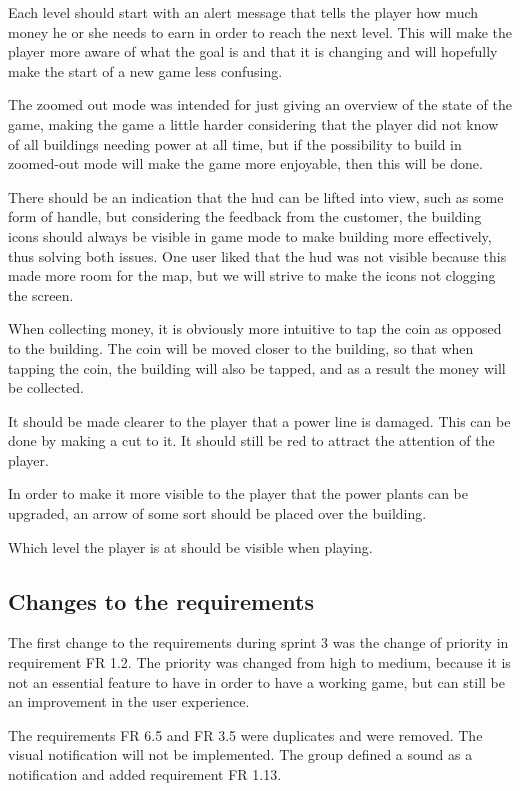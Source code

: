 	Each level should start with an alert message that tells the player how much money he or she needs to earn in order to reach the next level. This will make the player more aware of what the goal is and that it is changing and will hopefully make the start of a new game less confusing.

	The zoomed out mode was intended for just giving an overview of the state of the game, making the game a little harder considering that the player did not know of all buildings needing power at all time, but if the possibility to build in zoomed-out mode will make the game more enjoyable, then this will be done.

	There should be an indication that the hud can be lifted into view, such as some form of handle, but considering the feedback from the customer, the building icons should always be visible in game mode to make building more effectively, thus solving both issues. One user liked that the hud was not visible because this made more room for the map, but we will strive to make the icons not clogging the screen.

	When collecting money, it is obviously more intuitive to tap the coin as opposed to the building. The coin will be moved closer to the building, so that when tapping the coin, the building will also be tapped, and as a result the money will be collected.

	It should be made clearer to the player that a power line is damaged. This can be done by making a cut to it. It should still be red to attract the attention of the player.

	In order to make it more visible to the player that the power plants can be upgraded, an arrow of some sort should be placed over the building.

	Which level the player is at should be visible when playing.

\subsection{Changes to the requirements}

	The first change to the requirements during sprint 3 was the change of priority in requirement FR 1.2. The priority was changed from high to medium, because it is not an essential feature to have in order to have a working game, but can still be an improvement in the user experience.

	The requirements FR 6.5 and FR 3.5 were duplicates and were removed. The visual notification will not be implemented. The group defined a sound as a notification and added requirement FR 1.13.

